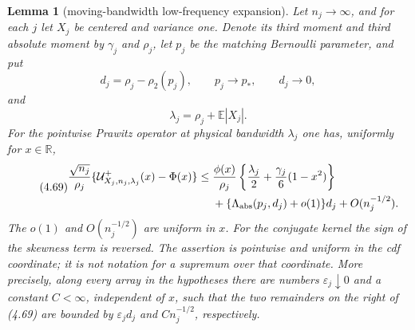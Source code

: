 \documentclass[11pt,a4paper]{article}
\numberwithin{equation}{section}
\newtheorem{lemma}[theorem]{Lemma}
\theoremstyle{definition}
\theoremstyle{remark}
\newcommand{\E}{\mathbb E}
\begin{document}
\begin{lemma}[moving-bandwidth low-frequency expansion]
\label{orig:lem:movinglow}
Let $n_j\to\infty$, and for each $j$ let $X_j$ be centered and
variance one.  Denote its third moment and third absolute moment by
$\gamma_j$ and $\rho_j$, let $p_j$ be the matching Bernoulli parameter,
and put
\[
 d_j=\rho_j-\rho_2(p_j),\qquad p_j\to p_*,\qquad d_j\to0,
\]
and
\[
 \lambda_j=\rho_j+\E|X_j|.
\]
For the pointwise Prawitz operator at physical bandwidth $\lambda_j$ one
has, uniformly for $x\in\mathbb R$,
\begin{equation}\tag{4.69}
\begin{split}
 {\sqrt {n_j}\over\rho_j}
   \{\mathcal U^+_{X_j,n_j,\lambda_j}(x)-\Phi(x)\}
 \le{}&{\phi(x)\over\rho_j}
       \left\{{\lambda_j\over2}+{\gamma_j\over6}(1-x^2)\right\}\\
 &+\{\Lambda_{\rm abs}(p_j,d_j)+o(1)\}d_j
       +O(n_j^{-1/2}).
\end{split}
\end{equation}
The $o(1)$ and $O(n_j^{-1/2})$ are uniform in $x$.  For the conjugate
kernel the sign of the skewness term is reversed.  The assertion is
pointwise and uniform in the cdf coordinate; it is not notation for a
supremum over that coordinate.  More precisely, along every array in the
hypotheses there are numbers $\varepsilon_j\downarrow0$ and a constant
$C<\infty$, independent of $x$, such that the two remainders on the
right of \textup{(4.69)} are bounded by
$\varepsilon_jd_j$ and $Cn_j^{-1/2}$, respectively.
\end{lemma}
\end{document}
